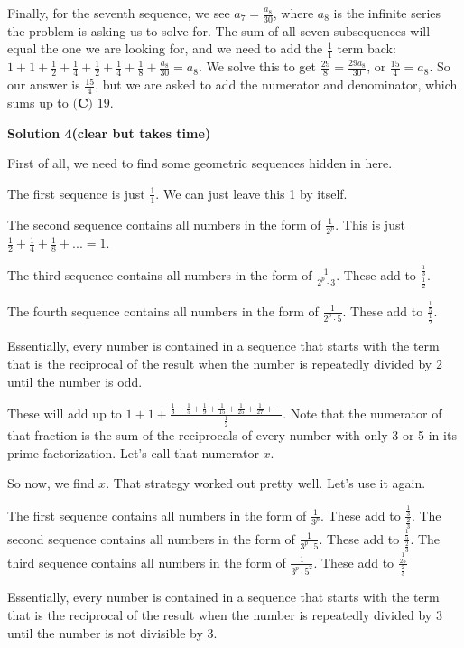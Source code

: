 \begin{enumerate}
 Finally, for the seventh sequence, we see $a_{7}=\frac{a_{8}}{30}$, where $a_{8}$  is the infinite series the problem is asking us to solve for. The sum of all seven subsequences will equal the one we are looking for, and we need to add the $\frac11$ term back: $1+1+\frac{1}{2}+\frac{1}{4}+\frac{1}{2}+\frac{1}{4}+\frac{1}{8}+\frac{a_{8}}{30}=a_{8}$. We solve this to get $\frac{29}{8}=\frac{29a_{8}}{30}$, or $\frac{15}{4}=a_{8}$. So our answer is $\frac{15}{4}$, but we are asked to add the numerator and denominator, which sums up to $\boxed{\textbf{(C) } 19}$.

 



\textbf{Solution 4(clear but takes time)}

First of all, we need to find some geometric sequences hidden in here.

 The first sequence is just $\frac{1}{1}$. We can just leave this 1 by itself.

 The second sequence contains all numbers in the form of $\frac{1}{2^p}$. This is just $\frac{1}{2} + \frac{1}{4} + \frac{1}{8} + ... = 1$.

 The third sequence contains all numbers in the form of $\frac{1}{2^p\cdot 3}$. These add to $\frac{\frac13}{\frac12}$.

 The fourth sequence contains all numbers in the form of $\frac{1}{2^p\cdot 5}$. These add to $\frac{\frac15}{\frac12}$.

 Essentially, every number is contained in a sequence that starts with the term that is the reciprocal of the result when the number is repeatedly divided by 2 until the number is odd.

 These will add up to $1+1+\frac{\frac{1}{3}+\frac{1}{5}+\frac{1}{9}+\frac{1}{15}+\frac{1}{25}+\frac{1}{27}+\cdots}{\frac{1}{2}}$. Note that the numerator of that fraction is the sum of the reciprocals of every number with only 3 or 5 in its prime factorization. Let's call that numerator $x$.

 So now, we find $x$. That strategy worked out pretty well. Let's use it again.

 The first sequence contains all numbers in the form of $\frac{1}{3^p}$. These add to $\frac{\frac13}{\frac23}$. The second sequence contains all numbers in the form of $\frac{1}{3^p\cdot5}$. These add to $\frac{\frac15}{\frac23}$. The third sequence contains all numbers in the form of $\frac{1}{3^p\cdot 5^2}$. These add to $\frac{\frac{1}{25}}{\frac{2}{3}}$

 Essentially, every number is contained in a sequence that starts with the term that is the reciprocal of the result when the number is repeatedly divided by 3 until the number is not divisible by 3.


\end{enumerate}
